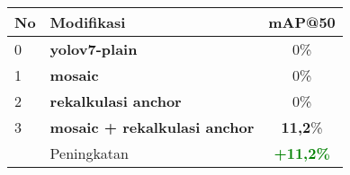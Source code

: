 \begin{table}[H]
  \centering
  \label{tbl:mosaic_reanchor_performance}
  \vspace{-1ex}
  \begin{tabular}{ l l c }
    \toprule[1.5pt]
    No & Modifikasi        &mAP@50 \\
    \midrule
    0  & \textbf{yolov7-plain               }& 0\%\\
    1  & \textbf{mosaic                     }& 0\%\\
    2  & \textbf{rekalkulasi anchor         }& 0\%\\
    3  & \textbf{mosaic + rekalkulasi anchor}& \textbf{11,2}\%\\
    \midrule
       & Peningkatan                         & \textbf{\textcolor{green}{+11,2\%}}\\
    \bottomrule[1.5pt]
  \end{tabular}
\end{table}